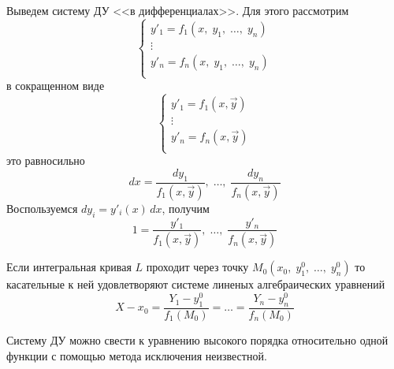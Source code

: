 \begin{Note}
    Выведем систему ДУ <<в дифференциалах>>. Для этого рассмотрим
    \[
        \begin{cases}
            y'_1 = f_1(x,\; y_1,\; \dots,\; y_n)\\
            \vdots\\
            y'_n = f_n(x,\; y_1,\; \dots,\; y_n)\\
        \end{cases}
    \]
    в сокращенном виде
    \[
        \begin{cases}
            y'_1 = f_1(x, \vec{y})\\
            \vdots\\
            y'_n = f_n(x, \vec{y})\\
        \end{cases}
    \]
    это равносильно
    \[
        dx = \frac{dy_1}{f_1(x, \vec{y})},\; \dots,\; \frac{dy_n}{f_n(x, \vec{y})}
    \]
    Воспользуемся $dy_i = y'_i(x)\,dx$, получим
    \[
        1 = \frac{y'_1}{f_1(x, \vec{y})},\; \dots,\; \frac{y'_n}{f_n(x, \vec{y})}
    \]
    
    Если интегральная кривая $L$ проходит через точку $M_0(x_0,\; y^0_1,\; \dots,\; y^0_n)$ то касательные к ней удовлетворяют системе линеных алгебраических уравнений
    \[
        X - x_0 = \frac{Y_1 - y^0_1}{f_1(M_0)} = \dots = \frac{Y_n - y^0_n}{f_n(M_0)}
    \]
\end{Note}

\begin{Note}
    Систему ДУ можно свести к уравнению высокого порядка относительно одной функции с помощью метода исключения неизвестной.
\end{Note}

